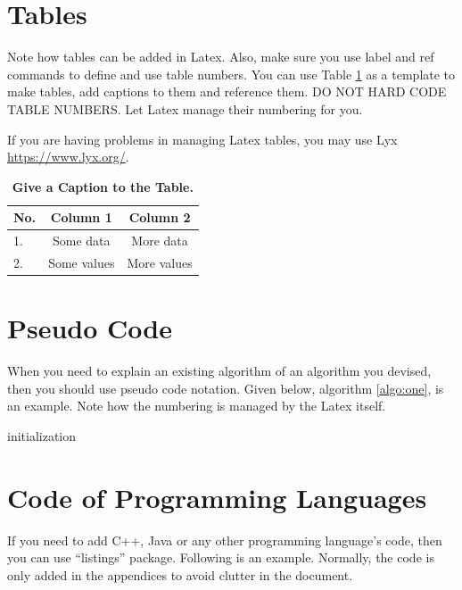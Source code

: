 \documentclass{FastFyp}
\begin{document}
\section{Tables}
Note how tables can be added in Latex.  Also, make sure you use label and ref commands to define and use table numbers.  You can use Table \ref{tbl:SomeTable} as a template to make tables, add captions to them and reference them.  DO NOT HARD CODE TABLE NUMBERS.  Let Latex manage their numbering for you.

If you are having problems in managing Latex tables, you may use Lyx \url{https://www.lyx.org/}. 


\begin{table}[hbt]

\begin{center}
\caption{\label{tbl:SomeTable} \textbf{Give a Caption to the Table.}}
\begin{tabular}{|l|c|c|} 
\hline
\textbf{No.}&\textbf{Column 1}&\textbf{Column 2}\\
\hline
1.&Some data&More data\\
\hline
2.&Some values&More values\\
\hline
\end {tabular}

\end{center}

\end{table}

\section{Pseudo Code}
When you need to explain an existing algorithm of an algorithm you devised, then you should use pseudo code notation. Given below, algorithm  \ref{algo:one}, is an example. Note how the numbering is managed by the Latex itself.

\begin{algorithm}[H]
 initialization\;
 \caption{How to write algorithms}
 \label{algo:one}
\end{algorithm}

\section{Code of Programming Languages}
If you need to add C++, Java or any other programming language's code, then you can use ``listings'' package. Following is an example. Normally, the code is only added in the appendices to avoid clutter in the document.
\end{document}
